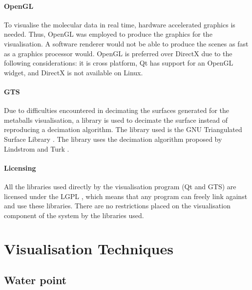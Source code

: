 
\paragraph{OpenGL}

To visualise the molecular data in real time, hardware accelerated graphics is
needed. Thus, OpenGL \citep{OpenGL} was employed to produce the graphics for
the visualisation. A software renderer would not be able to produce the scenes
as fast as a graphics processor would. OpenGL is preferred over DirectX due to
the following considerations: it is cross platform, Qt has support for an
OpenGL widget, and DirectX is not available on Linux.


\paragraph{GTS}

Due to difficulties encountered in decimating the surfaces generated for the
metaballs visualisation, a library is used to decimate the surface instead of
reproducing a decimation algorithm. The library used is the GNU Triangulated
Surface Library \citep{GTS}. The library uses the decimation algorithm proposed
by Lindstrom and Turk \citep{lindstrom98}.


\paragraph{Licensing}

All the libraries used directly by the visualisation program (Qt and GTS) are
licensed under the LGPL \citep{LGPL}, which means that any program can freely
link against and use these libraries. There are no restrictions placed on the
visualisation component of the system by the libraries used.



\section{Visualisation Techniques}
\label{sec:implementation_techniques}

\subsection*{Water point}

